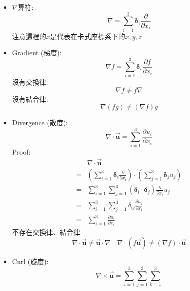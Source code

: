 \documentclass[../main.tex]{subfiles}
\begin{document}
\begin{itemize}
\begin{itemize}
      \item $\nabla$算符:
        \begin{equation}
          \boxed{\nabla = \sum_{i=1}^3 \bm \delta_i \frac{\partial}{\partial x_i}}
        \end{equation}
        注意這裡的$x$是代表在卡式座標系下的$x,y,z$
      \item Gradient (梯度):
        \begin{equation}
          \boxed{\nabla f = \sum_{i=1}^3 \bm \delta_i \frac{\partial f}{\partial x_i}}
        \end{equation}
        沒有交換律:
        \begin{equation}
          \boxed{\nabla f \neq f \nabla}
        \end{equation}
        沒有結合律:
        \begin{equation}
          \boxed{\nabla (fg) \neq (\nabla f) g}
        \end{equation}
      \item Divergence (散度):
        \begin{equation}
          \boxed{\nabla \cdot \vec {\bm u} = \sum_{i=1}^3\frac{\partial u_i}{\partial x_i}}
        \end{equation}
        Proof:
        \begin{align}
          &\nabla \cdot \vec {\bm u} \nonumber\\
         =& \left(
          \sum_{i=1}^3 \bm \delta_i \frac{\partial}{\partial x_i}
          \right) \cdot \left(
            \sum_{j=1}^3 \bm \delta_j u_j
          \right)\\
        =&\sum_{i=1}^3 \sum_{j=1}^3 \left(
          \bm \delta_i \cdot \bm \delta_j
        \right) \frac{\partial}{\partial x_i} u_j \nonumber\\
        =&\sum_{i=1}^3 \sum_{j=1}^3 \delta_{ij} \frac{\partial u_j}{\partial x_i} \nonumber\\
        =&\sum_{i=1}^3 \frac{\partial u_i}{\partial x_i}
        \end{align}
        不存在交換律、結合律
        \begin{equation}
          \boxed{\nabla \cdot \vec {\bm u} \neq \vec {\bm u} \cdot \nabla} \quad \boxed{\nabla \cdot (f \vec {\bm u}) \neq (\nabla f) \cdot \vec {\bm u}}
        \end{equation}
      \item Curl (旋度):
        \begin{equation}
          \boxed{\nabla \times \vec {\bm u} = \sum_{i=1}^3 \sum_{j=1}^3 \sum_{k=1}^3 
}
\end{equation}
\end{itemize}
\end{itemize}
\end{document}
